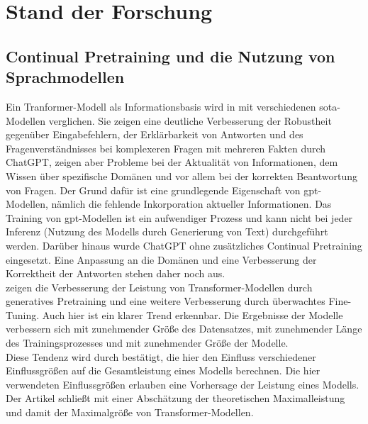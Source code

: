 \chapter{Stand der Forschung}\label{ch:relatedWork}
\section{Continual Pretraining und die Nutzung von Sprachmodellen}

Ein Tranformer-Modell als Informationsbasis wird in \citet{chatgpt_qas} mit verschiedenen \ac{sota}-Modellen verglichen. 
Sie zeigen eine deutliche Verbesserung der Robustheit gegenüber Eingabefehlern, der Erklärbarkeit von Antworten und des Fragenverständnisses bei komplexeren Fragen mit mehreren Fakten durch ChatGPT, zeigen aber Probleme bei der Aktualität von Informationen, dem Wissen über spezifische Domänen und vor allem bei der korrekten Beantwortung von Fragen. 
Der Grund dafür ist eine grundlegende Eigenschaft von \ac{gpt}-Modellen, nämlich die fehlende Inkorporation aktueller Informationen. 
Das Training von \ac{gpt}-Modellen ist ein aufwendiger Prozess und kann nicht bei jeder Inferenz (Nutzung des Modells durch Generierung von Text) durchgeführt werden. 
Darüber hinaus wurde ChatGPT ohne zusätzliches Continual Pretraining eingesetzt.
Eine Anpassung an die Domänen und eine Verbesserung der Korrektheit der Antworten stehen daher noch aus.\\

\citet{gpt1} zeigen die Verbesserung der Leistung von Transformer-Modellen durch generatives Pretraining und eine weitere Verbesserung durch überwachtes Fine-Tuning.
Auch hier ist ein klarer Trend erkennbar. Die Ergebnisse der Modelle verbessern sich mit zunehmender Größe des Datensatzes, mit zunehmender Länge des Trainingsprozesses und mit zunehmender Größe der Modelle.\\

Diese Tendenz wird durch \citet{scaling_laws} bestätigt, die hier den Einfluss verschiedener Einflussgrößen auf die Gesamtleistung eines Modells berechnen. Die hier verwendeten Einflussgrößen erlauben eine Vorhersage der Leistung eines Modells. 
Der Artikel schließt mit einer Abschätzung der theoretischen Maximalleistung und damit der Maximalgröße von Transformer-Modellen.\\

